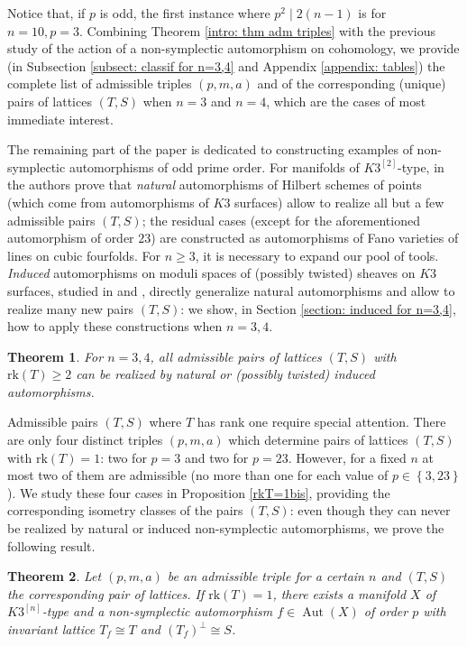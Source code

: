 \documentclass{amsart}
\newtheorem{theorem}{Theorem}[section]
\theoremstyle{definition}
\newcommand{\rk}{\mathrm{rk}}
\newcommand{\hsk}{K3^{\left[2\right]}}
\newcommand{\hskn}{K3^{\left[n\right]}}
\DeclareMathOperator{\aut}{Aut}
\begin{document}
Notice that, if $p$ is odd, the first instance where $p^2 \mid 2(n-1)$ is for \mbox{$n=10, p=3$}. Combining Theorem \ref{intro: thm adm triples} with the previous study of the action of a non-symplectic automorphism on cohomology, we provide (in Subsection \ref{subsect: classif for n=3,4} and Appendix \ref{appendix: tables}) the complete list of admissible triples $(p,m,a)$ and of the corresponding (unique) pairs of lattices $(T,S)$ when $n=3$ and $n=4$, which are the cases of most immediate interest.

The remaining part of the paper is dedicated to constructing examples of non-symplectic automorphisms of odd prime order. For manifolds of $\hsk$-type, in \cite{bcs} the authors prove that \emph{natural} automorphisms of Hilbert schemes of points (which come from automorphisms of $K3$ surfaces) allow to realize all but a few admissible pairs $(T,S)$; the residual cases (except for the aforementioned automorphism of order $23$) are constructed as automorphisms of Fano varieties of lines on cubic fourfolds. For $n \geq 3$, it is necessary to expand our pool of tools. \emph{Induced} automorphisms on moduli spaces of (possibly twisted) sheaves on $K3$ surfaces, studied in \cite{mw} and \cite{ckkm}, directly generalize natural automorphisms and allow to realize many new pairs $(T,S)$: we show, in Section \ref{section: induced for n=3,4}, how to apply these constructions when $n=3,4$.

\begin{theorem}
For $n=3,4$, all admissible pairs of lattices $(T,S)$ with $\rk(T) \geq 2$ can be realized by natural or (possibly twisted) induced automorphisms. 
\end{theorem}

Admissible pairs $(T,S)$ where $T$ has rank one require special attention. There are only four distinct triples $(p,m,a)$ which determine pairs of lattices $(T,S)$ with $\rk(T) = 1$: two for $p=3$ and two for $p=23$. However, for a fixed $n$ at most two of them are admissible (no more than one for each value of $p \in \left\{ 3,23 \right\}$). We study these four cases in Proposition \ref{rkT=1bis}, providing the corresponding isometry classes of the pairs $(T,S)$: even though they can never be realized by natural or induced non-symplectic automorphisms, we prove the following result.

\begin{theorem}
Let $(p,m,a)$ be an admissible triple for a certain $n$ and $(T,S)$ the corresponding pair of lattices. If $\rk(T) = 1$,  there exists a manifold $X$ of $\hskn$-type and a non-symplectic automorphism $f \in \aut(X)$ of order $p$ with invariant lattice $T_f \cong T$ and $\left( T_f \right)^\perp \cong S$. 
\end{theorem}
\end{document}
